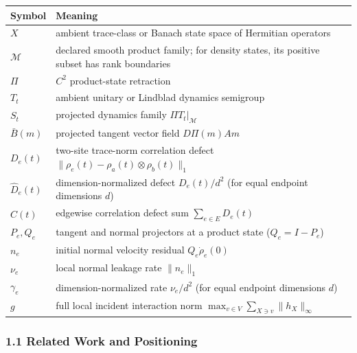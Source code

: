 \documentclass[
  11pt,
]{article}
\begin{document}
\begin{longtable}[]{@{}
  >{\raggedright\arraybackslash}p{}
  >{\raggedright\arraybackslash}p{}@{}}
\toprule\noalign{}
\begin{minipage}[b]{\linewidth}\raggedright
Symbol
\end{minipage} & \begin{minipage}[b]{\linewidth}\raggedright
Meaning
\end{minipage} \\
\midrule\noalign{}
\endhead
\bottomrule\noalign{}
\endlastfoot
\(X\) & ambient trace-class or Banach state space of Hermitian operators \\
\(\mathcal{M}\) & declared smooth product family; for density states, its positive subset has rank boundaries \\
\(\Pi\) & \(C^2\) product-state retraction \\
\(T_t\) & ambient unitary or Lindblad dynamics semigroup \\
\(S_t\) & projected dynamics family \(\Pi T_t\rvert_{\mathcal{M}}\) \\
\(\bar B(m)\) & projected tangent vector field \(D\Pi(m)Am\) \\
\(D_e(t)\) & two-site trace-norm correlation defect \(\lVert\rho_e(t)-\rho_a(t)\otimes\rho_b(t)\rVert_1\) \\
\(\widehat D_e(t)\) & dimension-normalized defect \(D_e(t)/d^2\) (for equal endpoint dimensions \(d\)) \\
\(C(t)\) & edgewise correlation defect sum \(\sum_{e\in E}D_e(t)\) \\
\(P_e, Q_e\) & tangent and normal projectors at a product state (\(Q_e = I-P_e\)) \\
\(n_e\) & initial normal velocity residual \(Q_e\dot\rho_e(0)\) \\
\(\nu_e\) & local normal leakage rate \(\lVert n_e\rVert_1\) \\
\(\gamma_e\) & dimension-normalized rate \(\nu_e/d^2\) (for equal endpoint dimensions \(d\)) \\
\(g\) & full local incident interaction norm \(\max_{v\in V}\sum_{X\ni v}\lVert h_X\rVert_\infty\) \\
\end{longtable}

\subsubsection{1.1 Related Work and Positioning}\label{related-work-and-positioning}
\end{document}
